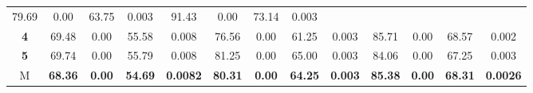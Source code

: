 \begin{table}[H]
\begin{tabular}{ccccccccccccc}
		\multicolumn{1}{c|}{79.69} &
		\multicolumn{1}{c|}{0.00} &
		\multicolumn{1}{c|}{63.75} &
		\multicolumn{1}{c|}{0.003} &
		\multicolumn{1}{c|}{91.43} &
		\multicolumn{1}{c|}{0.00} &
		\multicolumn{1}{c|}{73.14} &
		\multicolumn{1}{c|}{0.003} \\ \cline{2-13} 
		\multicolumn{1}{c|}{\cellcolor[HTML]{C0C0C0}\textbf{4}} &
		\multicolumn{1}{c|}{69.48} &
		\multicolumn{1}{c|}{0.00} &
		\multicolumn{1}{c|}{55.58} &
		\multicolumn{1}{c|}{0.008} &
		\multicolumn{1}{c|}{76.56} &
		\multicolumn{1}{c|}{0.00} &
		\multicolumn{1}{c|}{61.25} &
		\multicolumn{1}{c|}{0.003} &
		\multicolumn{1}{c|}{85.71} &
		\multicolumn{1}{c|}{0.00} &
		\multicolumn{1}{c|}{68.57} &
		\multicolumn{1}{c|}{0.002} \\ \cline{2-13} 
		\multicolumn{1}{c|}{\cellcolor[HTML]{C0C0C0}\textbf{5}} &
		\multicolumn{1}{c|}{69.74} &
		\multicolumn{1}{c|}{0.00} &
		\multicolumn{1}{c|}{55.79} &
		\multicolumn{1}{c|}{0.008} &
		\multicolumn{1}{c|}{81.25} &
		\multicolumn{1}{c|}{0.00} &
		\multicolumn{1}{c|}{65.00} &
		\multicolumn{1}{c|}{0.003} &
		\multicolumn{1}{c|}{84.06} &
		\multicolumn{1}{c|}{0.00} &
		\multicolumn{1}{c|}{67.25} &
		\multicolumn{1}{c|}{0.003} \\ \cline{2-13} 
		\multicolumn{1}{c|}{\cellcolor[HTML]{FFFE65}M} &
		\multicolumn{1}{c|}{\textbf{68.36}} &
		\multicolumn{1}{c|}{\textbf{0.00}} &
		\multicolumn{1}{c|}{\textbf{54.69}} &
		\multicolumn{1}{c|}{\textbf{0.0082}} &
		\multicolumn{1}{c|}{\textbf{80.31}} &
		\multicolumn{1}{c|}{\textbf{0.00}} &
		\multicolumn{1}{c|}{\textbf{64.25}} &
		\multicolumn{1}{c|}{\textbf{0.003}} &
		\multicolumn{1}{c|}{\textbf{85.38}} &
		\multicolumn{1}{c|}{\textbf{0.00}} &
		\multicolumn{1}{c|}{\textbf{68.31}} &
		\multicolumn{1}{c|}{\textbf{0.0026}} \\ \cline{2-13} 
	\end{tabular}
\end{table}